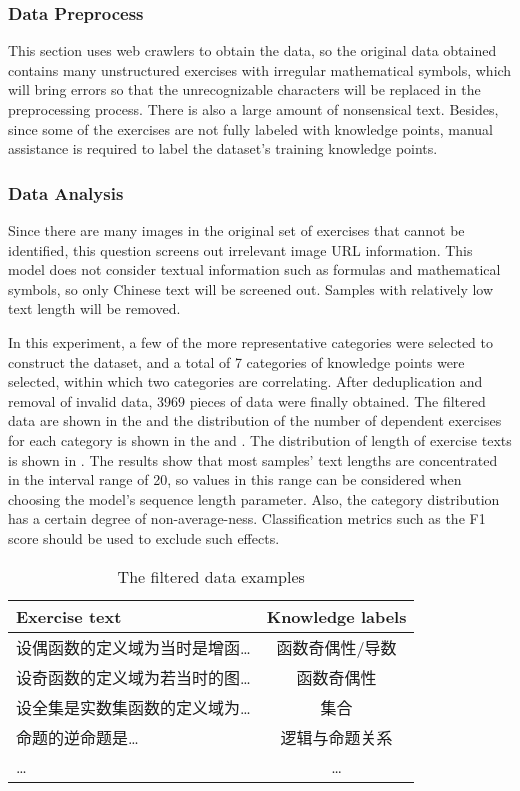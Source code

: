 \subsubsection{Data Preprocess}
This section uses web crawlers to obtain the data, so the original data obtained contains many unstructured exercises with irregular mathematical symbols, which will bring errors so that the unrecognizable characters will be replaced in the preprocessing process. There is also a large amount of nonsensical text. Besides, since some of the exercises are not fully labeled with knowledge points, manual assistance is required to label the dataset's training knowledge points.


\subsubsection{Data Analysis}
Since there are many images in the original set of exercises that cannot be identified, this question screens out irrelevant image URL information. This model does not consider textual information such as formulas and mathematical symbols, so only Chinese text will be screened out. Samples with relatively low text length will be removed.

In this experiment, a few of the more representative categories were selected to construct the dataset, and a total of 7 categories of knowledge points were selected, within which two categories are correlating. After deduplication and removal of invalid data, 3969 pieces of data were finally obtained. The filtered data are shown in the \tblname{\ref{tbl:ch2-rawdata}} and the distribution of the number of dependent exercises for each category is shown in the \tblname{\ref{tbl:ch2-rawdata-dist}} and \figname{\ref{fig:ch2-data-belonging}}. The distribution of length of exercise texts is shown in \figname{\ref{fig:ch2-data-lendis}}. The results show that most samples' text lengths are concentrated in the interval range of 20, so values in this range can be considered when choosing the model's sequence length parameter. Also, the category distribution has a certain degree of non-average-ness. Classification metrics such as the F1 score should be used to exclude such effects.

\begin{table}[htb]
    \caption{The filtered data examples}\label{tbl:ch2-rawdata}
    \centering
    \begin{tabular}{l c}
        \toprule
        Exercise text                      & Knowledge labels \\
        \midrule
        设偶函数的定义域为当时是增函\ldots & 函数奇偶性/导数  \\
        设奇函数的定义域为若当时的图\ldots & 函数奇偶性       \\
        设全集是实数集函数的定义域为\ldots & 集合             \\
        命题的逆命题是\ldots               & 逻辑与命题关系   \\
        \ldots                             & \ldots           \\
        \bottomrule
    \end{tabular}
\end{table}

